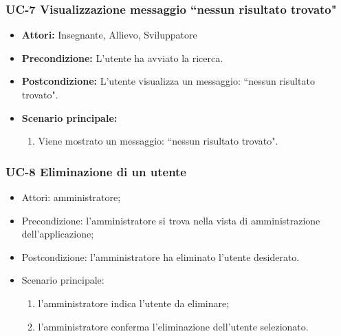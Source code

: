\subsubsection{UC-7 Visualizzazione messaggio ``nessun risultato trovato"}
\begin{itemize}
		\item \textbf{Attori: } Insegnante, Allievo, Sviluppatore
		
		\item \textbf{Precondizione: }L'utente ha avviato la ricerca. 
		\item \textbf{Postcondizione: }L'utente visualizza un messaggio: ``nessun risultato trovato".
		\item \textbf{Scenario principale: }
		\begin{enumerate}
			\item Viene mostrato un messaggio: ``nessun risultato trovato".
		\end{enumerate}
\end{itemize}

\subsubsection{UC-8 Eliminazione di un utente}
	\begin{itemize}
			\item Attori: amministratore;
			\item Precondizione: l'amministratore si trova nella vista di amministrazione dell'applicazione;
			\item Postcondizione: l'amministratore ha eliminato l'utente desiderato.
			\item Scenario principale:
				\begin{enumerate}
					\item l'amministratore indica l'utente da eliminare;
					\item l'amministratore conferma l'eliminazione dell'utente selezionato.
				\end{enumerate}
		\end{itemize}
	
